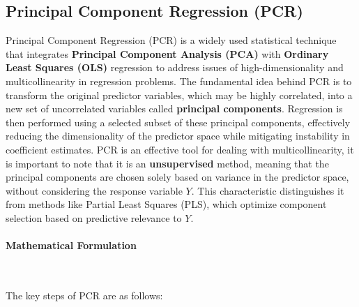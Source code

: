 \documentclass[11pt,twoside,a4paper]{article}
\begin{document}
\subsection{Principal Component Regression (PCR)}

Principal Component Regression (PCR) is a widely used statistical technique that integrates \textbf{Principal Component Analysis (PCA)} with \textbf{Ordinary Least Squares (OLS)} regression to address issues of high-dimensionality and multicollinearity in regression problems. The fundamental idea behind PCR is to transform the original predictor variables, which may be highly correlated, into a new set of uncorrelated variables called \textbf{principal components}. Regression is then performed using a selected subset of these principal components, effectively reducing the dimensionality of the predictor space while mitigating instability in coefficient estimates.
PCR is an effective tool for dealing with multicollinearity, it is important to note that it is an \textbf{unsupervised} method, meaning that the principal components are chosen solely based on variance in the predictor space, without considering the response variable \( Y \). This characteristic distinguishes it from methods like Partial Least Squares (PLS), which optimize component selection based on predictive relevance to \( Y \).

\paragraph{Mathematical Formulation} \ \

The key steps of PCR are as follows:
\end{document}

